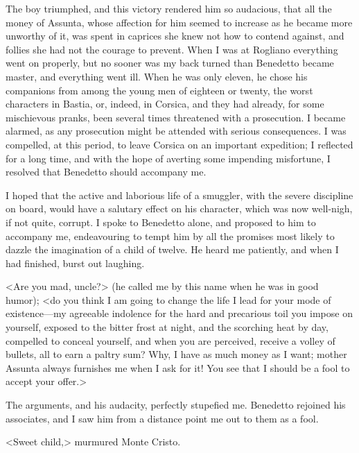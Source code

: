 {The boy triumphed, and this victory rendered him so audacious, that all the money of Assunta, whose affection for him seemed to increase as he became more unworthy of it, was spent in caprices she knew not how to contend against, and follies she had not the courage to prevent. When I was at Rogliano everything went on properly, but no sooner was my back turned than Benedetto became master, and everything went ill. When he was only eleven, he chose his companions from among the young men of eighteen or twenty, the worst characters in Bastia, or, indeed, in Corsica, and they had already, for some mischievous pranks, been several times threatened with a prosecution. I became alarmed, as any prosecution might be attended with serious consequences. I was compelled, at this period, to leave Corsica on an important expedition; I reflected for a long time, and with the hope of averting some impending misfortune, I resolved that Benedetto should accompany me. 

I hoped that the active and laborious life of a smuggler, with the severe discipline on board, would have a salutary effect on his character, which was now well-nigh, if not quite, corrupt. I spoke to Benedetto alone, and proposed to him to accompany me, endeavouring to tempt him by all the promises most likely to dazzle the imagination of a child of twelve. He heard me patiently, and when I had finished, burst out laughing. 

<Are you mad, uncle?> (he called me by this name when he was in good humor); <do you think I am going to change the life I lead for your mode of existence—my agreeable indolence for the hard and precarious toil you impose on yourself, exposed to the bitter frost at night, and the scorching heat by day, compelled to conceal yourself, and when you are perceived, receive a volley of bullets, all to earn a paltry sum? Why, I have as much money as I want; mother Assunta always furnishes me when I ask for it! You see that I should be a fool to accept your offer.> 

The arguments, and his audacity, perfectly stupefied me. Benedetto rejoined his associates, and I saw him from a distance point me out to them as a fool.}

 <Sweet child,> murmured Monte Cristo. 

